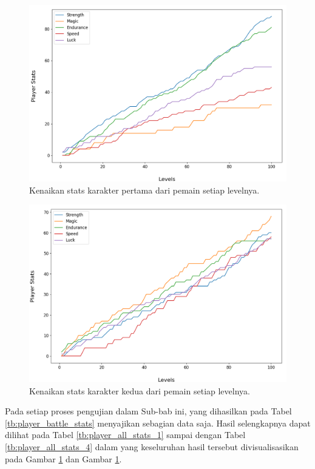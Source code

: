 \begin{figure} [!h] \centering
	\includegraphics[scale=0.52]{img/PlayerStatsDistrib1.png}
	\caption{Kenaikan stats karakter pertama dari pemain setiap levelnya.}
	\label{fig:stats_player_1}
\end{figure}

\begin{figure} [!h] \centering
	\includegraphics[scale=0.52]{img/PlayerStatsDistrib2.png}
	\caption{Kenaikan stats karakter kedua dari pemain setiap levelnya.}
	\label{fig:stats_player_2}
\end{figure}

Pada setiap proses pengujian dalam Sub-bab ini, yang dihasilkan pada Tabel \ref{tb:player_battle_stats} menyajikan sebagian data saja. Hasil selengkapnya dapat dilihat pada Tabel \ref{tb:player_all_stats_1} sampai dengan Tabel \ref{tb:player_all_stats_4} dalam  yang keseluruhan hasil tersebut divisualisasikan pada Gambar \ref{fig:stats_player_1} dan Gambar \ref{fig:stats_player_1}.
\vspace{1ex}


